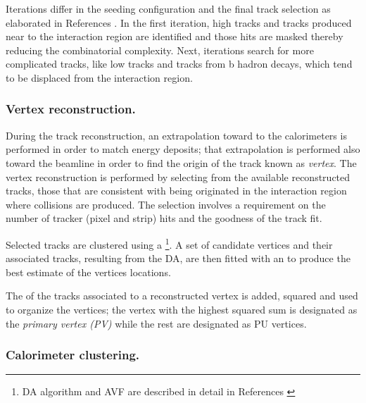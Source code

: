 Iterations differ in the seeding configuration and the final track selection as elaborated in References \cite{particle_flow, particle_flow2}. In the first iteration, high \pt tracks and tracks produced near to the interaction region are identified and those hits are masked thereby reducing the combinatorial complexity. Next, iterations search for more complicated tracks, like low \pt tracks and tracks from b hadron decays, which tend to be displaced from the interaction region.

\subsubsection*{Vertex reconstruction.}

During the track reconstruction, an extrapolation toward to the calorimeters is performed in order to match energy deposits; that extrapolation is performed also toward the beamline in order to find the origin of the track known as \textit{vertex}. The vertex reconstruction is performed by selecting from the available reconstructed tracks, those that are consistent with being originated in the interaction region where \pp collisions are produced. The selection involves a requirement on the number of tracker (pixel and strip) hits and the goodness of the track fit.

Selected tracks are clustered using a \footnote{DA algorithm and AVF are described in detail in References \cite{da, avf}}. A set of candidate vertices and their associated tracks, resulting from the DA, are then fitted with an  to produce the best estimate of the vertices locations.

The \pt of the tracks associated to a reconstructed vertex is added, squared and used to organize the vertices; the vertex with the highest squared sum is designated as the \textit{primary vertex (PV)} while the rest are designated as PU vertices. 

\subsubsection*{Calorimeter clustering.}

